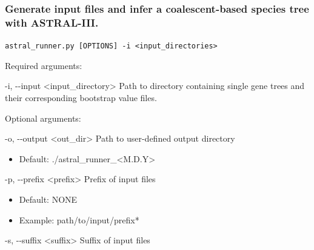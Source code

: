 \documentclass{article}
\def\code#1{\texttt{#1}}
\begin{document}
        \subsubsection{Generate input files and infer a coalescent-based species tree with ASTRAL-III.}
        \begin{description}
        
        
            \vspace{0.2cm}
            \item \code{astral\_runner.py [OPTIONS] -i <input\_directories>}
            \vspace{0.2cm}
        
            \begin{description}
                \item Required arguments:
                \begin{description}
                    \item -i, -\/-input \hspace{0.2cm} <input\_directory> \hspace{0.2cm} Path to directory containing single gene trees and their corresponding bootstrap value files.
                \end{description}
                \vspace{0.2cm}
                \item Optional arguments:
                \begin{description}
                    \item -o, -\/-output \hspace{0.2cm} <out\_dir> \hspace{0.2cm} Path to user-defined output directory
                    \begin{itemize}
                        \item Default: ./astral\_runner\_<M.D.Y> 
                    \end{itemize}
                    \item -p, -\/-prefix \hspace{0.2cm} <prefix> \hspace{0.2cm} Prefix of input files
                    \begin{itemize}
                        \item Default: NONE
                        \item Example: path/to/input/prefix*
                    \end{itemize}
                    \item -s, -\/-suffix \hspace{0.2cm} <suffix> \hspace{0.2cm} Suffix of input files

\end{description}
\end{description}
\end{description}
\end{document}
